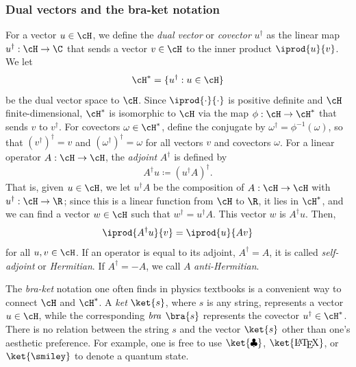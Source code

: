 \subsubsection{Dual vectors and the bra-ket notation}
For a vector $u \in \cH$, we define the \emph{dual vector} or \emph{covector} $u^\dag$ as the linear map $u^\dag: \cH \to \C$ that sends a vector $v \in \cH$ to the inner product $\iprod{u}{v}$. We let
\begin{equation}
    \cH^* = \{u^\dag: u \in \cH\}
\end{equation}
be the dual vector space to $\cH$. Since $\iprod{\cdot}{\cdot}$ is positive definite and $\cH$ finite-dimensional, $\cH^*$ is isomorphic to $\cH$ via the map $\phi: \cH \to \cH^*$ that sends $v$ to $v^\dag$. For covectors $\omega \in \cH^*$, define the conjugate by $\omega^\dag = \phi^{-1}(\omega)$, so that $(v^\dag)^\dag = v$ and $(\omega^\dag)^\dag = \omega$ for all vectors $v$ and covectors $\omega$. For a linear operator $A: \cH \to \cH$, the \emph{adjoint} $A^\dag$ is defined by
\begin{equation}
    A^\dag u \coloneqq (u^\dag A)^\dag.
\end{equation}
That is, given $u \in \cH$, we let $u^\dag A$ be the composition of $A: \cH \to \cH$ with $u^\dag: \cH \to \R$; since this is a linear function from $\cH$ to $\R$, it lies in $\cH^*$, and we can find a vector $w \in \cH$ such that $w^\dag = u^\dag A$. This vector $w$ is $A^\dag u$. Then,
\begin{equation}
    \iprod{A^\dag u}{v} = \iprod{u}{A v}
\end{equation}
for all $u, v \in \cH$. If an operator is equal to its adjoint, $A^\dag = A$, it is called \emph{self-adjoint} or \emph{Hermitian}. If $A^\dag = -A$, we call $A$ \emph{anti-Hermitian}.

The \emph{bra-ket} notation one often finds in physics textbooks is a convenient way to connect $\cH$ and $\cH^*$. A \emph{ket} $\ket{s}$, where $s$ is any string, represents a vector $u \in \cH$, while the corresponding $\emph{bra}$ $\bra{s}$ represents the covector $u^\dag \in \cH^*$. There is no relation between the string $s$ and the vector $\ket{s}$ other than one's aesthetic preference. For example, one is free to use $\ket{\clubsuit}$, $\ket{\text{\LaTeX}}$, or $\ket{\smiley}$ to denote a quantum state.



